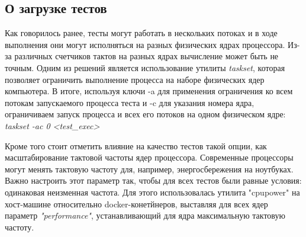 
\subsection{О загрузке тестов}
    Как говорилось ранее, тесты могут работать в нескольких потоках и в ходе выполнения они могут исполняться на разных физических ядрах процессора. Из-за различных счетчиков тактов на разных ядрах вычисление может быть не точным. Одним из решений является использование утилиты \textit{taskset}, которая позволяет ограничить выполнение процесса на наборе физических ядер компьютера. В итоге, используя ключи -a для применения ограничения ко всем потокам запускаемого процесса теста и -c для указания номера ядра, ограничиваем запуск процесса и всех его потоков на одном физическом ядре: \textit{taskset -ac 0 <test_exec>} 

    Кроме того стоит отметить влияние на качество тестов такой опции, как масштабирование тактовой частоты ядер процессора. Современные процессоры могут менять тактовую частоту для, например, энергосбережения на ноутбуках. Важно настроить этот параметр так, чтобы для всех тестов были равные условия: одинаковая неизменная частота. Для этого использовалась утилита "cpupower" на хост-машине относительно docker-конетйнеров, выставляя для всех ядер параметр \textit{"performance"}, устанавливающий для ядра максимальную тактовую частоту.
